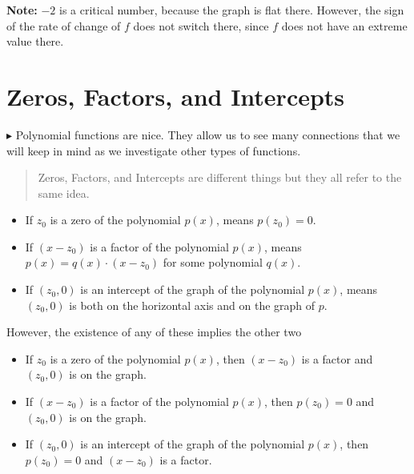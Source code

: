 \documentclass{ximera}
\begin{document}
\textbf{Note:} $-2$ is a critical number, because the graph is flat there.  However, the sign of the rate of change of $f$ does not switch there, since $f$ does not have an extreme value there.










\section{Zeros, Factors, and Intercepts}




$\blacktriangleright$ Polynomial functions are nice.  They allow us to see many connections that we will keep in mind as we investigate other types of functions.

\begin{quote}
Zeros, Factors, and Intercepts are different things but they all refer to the same idea.
\end{quote}




\begin{itemize}

\item If $z_0$ is a zero of the polynomial $p(x)$, means $p(z_0)=0$.


\item If $(x-z_0)$ is a factor of the polynomial $p(x)$, means $p(x) = q(x) \cdot (x-z_0)$ for some polynomial $q(x)$.


\item If $(z_0,0)$ is an intercept of the graph of the polynomial $p(x)$, means $(z_0,0)$ is both on the horizontal axis and on the graph of $p$.

\end{itemize}


However, the existence of any of these implies the other two






\begin{itemize}

\item If $z_0$ is a zero of the polynomial $p(x)$, then $(x-z_0)$ is a factor and $(z_0,0)$ is on the graph.


\item If $(x-z_0)$ is a factor of the polynomial $p(x)$, then $p(z_0)=0$ and $(z_0,0)$ is on the graph.


\item If $(z_0,0)$ is an intercept of the graph of the polynomial $p(x)$, then $p(z_0)=0$ and $(x-z_0)$ is a factor.

\end{itemize}
\end{document}
